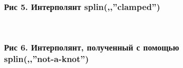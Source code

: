 \documentclass[russian,utf8,nocolumnxxxi,nocolumnxxxii]{eskdtext}
\begin{document}
\begin{figure}[H]
\begin{center}
\begin{minipage}[h]{0.70\linewidth}
  \\
\frametitle{Рис 5. Интерполянт splin(,,”clamped”)}
\end{minipage}
\end{center}
\end{figure}
\begin{figure}[H]
\begin{center}
\begin{minipage}[h]{0.70\linewidth}
  \\
\frametitle{Рис 6. Интерполянт, полученный с помощью splin(,,”not-a-knot”)}
\end{minipage}
\end{center}
\end{figure}
\end{document}
